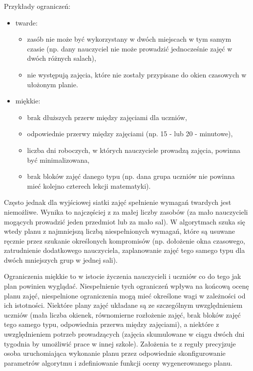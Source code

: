 \newpage
Przykłady ograniczeń:
\begin{itemize}
	\item twarde:
	\begin{itemize}
		\item zasób nie może być wykorzystany w dwóch miejscach w tym samym czasie (np. dany nauczyciel nie może prowadzić jednocześnie zajęć w dwóch różnych salach),
		\item nie występują zajęcia, które nie zostały przypisane do okien czasowych w ułożonym planie.
	\end{itemize}
	\item miękkie:
	\begin{itemize}
		\item brak dłuższych przerw między zajęciami dla uczniów,
		\item odpowiednie przerwy między zajęciami (np. 15 - lub 20 - minutowe),
		\item liczba dni roboczych, w których nauczyciele prowadzą zajęcia, powinna być minimalizowana,
		\item brak bloków zajęć danego typu (np. dana grupa uczniów nie powinna mieć kolejno czterech lekcji matematyki).
	\end{itemize}
\end{itemize}

Często jednak dla wyjściowej siatki zajęć spełnienie wymagań twardych jest niemożliwe. Wynika to najczęściej z za małej liczby zasobów (za mało nauczycieli mogących prowadzić jeden przedmiot lub za mało sal). W algorytmach szuka się wtedy planu z najmniejszą liczbą niespełnionych wymagań, które są usuwane ręcznie przez szukanie określonych kompromisów (np. dołożenie okna czasowego, zatrudnienie dodatkowego nauczyciela, zaplanowanie zajęć tego samego typu dla dwóch mniejszych grup w jednej sali).

Ograniczenia miękkie to w istocie życzenia nauczycieli i uczniów co do tego jak  plan powinien wyglądać. Niespełnienie tych ograniczeń wpływa na końcową ocenę planu zajęć, niespelnione ograniczenia mogą mieć określone wagi w zależności od ich istotności. Niektóre plany zajęć układane są ze szczególnym uwzględnieniem uczniów (mała liczba okienek, równomierne rozłożenie zajęć, brak bloków zajęć tego samego typu, odpowiednia przerwa między zajęciami), a niektóre z uwzględnieniem potrzeb prowadzących (zajęcia skumulowane w ciągu dwóch dni tygodnia by umożliwić prace w innej szkole). Założenia te z reguły precyjzuje osoba uruchomiająca wykonanie planu przez odpowiednie skonfigurowanie parametrów algorytmu i zdefiniowanie funkcji oceny wygenerowanego planu.

